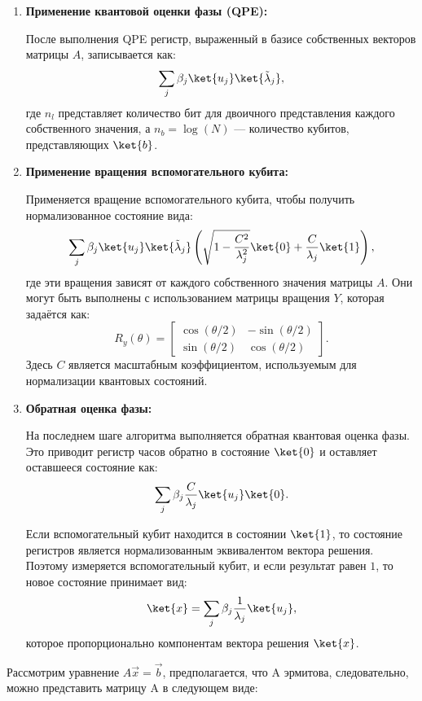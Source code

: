 \begin{enumerate}
    \item \textbf{Применение квантовой оценки фазы (QPE):}

    После выполнения QPE регистр, выраженный в базисе собственных векторов матрицы $A$, записывается как:
    \[
    \sum_j \beta_j \ket{u_j} \ket{\tilde{\lambda}_j},
    \]
    где $n_l$ представляет количество бит для двоичного представления каждого собственного значения, а $n_b = \log(N)$ — количество кубитов, представляющих $\ket{b}$.

    \item \textbf{Применение вращения вспомогательного кубита:}

    Применяется вращение вспомогательного кубита, чтобы получить нормализованное состояние вида:
    \[
    \sum_j \beta_j \ket{u_j} \ket{\tilde{\lambda}_j} \left( \sqrt{1 - \frac{C^2}{\lambda_j^2}} \ket{0} + \frac{C}{\lambda_j} \ket{1} \right),
    \]
    где эти вращения зависят от каждого собственного значения матрицы $A$. Они могут быть выполнены с использованием матрицы вращения $Y$, которая задаётся как:
    \[
    R_y(\theta) = 
    \begin{bmatrix}
    \cos(\theta/2) & -\sin(\theta/2) \\
    \sin(\theta/2) & \cos(\theta/2)
    \end{bmatrix}.
    \]
    Здесь $C$ является масштабным коэффициентом, используемым для нормализации квантовых состояний.

    \item \textbf{Обратная оценка фазы:}

    На последнем шаге алгоритма выполняется обратная квантовая оценка фазы. Это приводит регистр часов обратно в состояние $\ket{0}$ и оставляет оставшееся состояние как:
    \[
    \sum_j \beta_j \frac{C}{\lambda_j} \ket{u_j} \ket{0}.
    \]

    Если вспомогательный кубит находится в состоянии $\ket{1}$, то состояние регистров является нормализованным эквивалентом вектора решения. Поэтому измеряется вспомогательный кубит, и если результат равен $1$, то новое состояние принимает вид:
    \[
    \ket{x} = \sum_j \beta_j \frac{1}{\lambda_j} \ket{u_j},
    \]
    которое пропорционально компонентам вектора решения $\ket{x}$.
\end{enumerate}

\textbf{}

Рассмотрим уравнение \( A\vec{x} = \vec{b} \), предполагается, что A эрмитова, следовательно, можно представить матрицу A в следующем виде:

